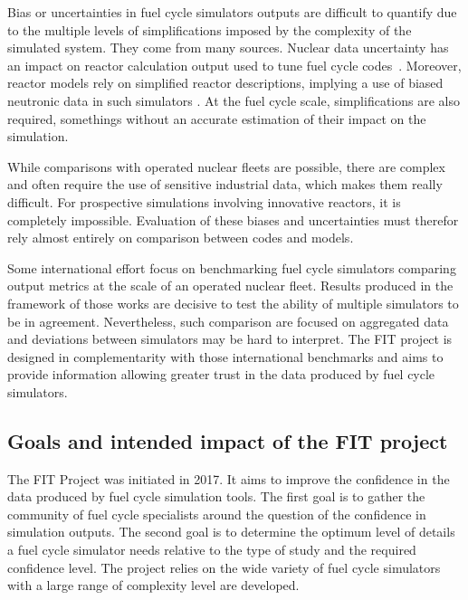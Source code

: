 Bias or uncertainties in fuel cycle simulators outputs are difficult to quantify due to the multiple levels of simplifications imposed by the complexity of the simulated system. They come from many sources.
Nuclear data uncertainty has an impact on reactor calculation output used to tune fuel cycle codes~\cite{Krivtchik_2014}.
Moreover, reactor models rely on simplified reactor descriptions, implying a use of biased neutronic data in such simulators \cite{Somaini_2017}.
At the fuel cycle scale, simplifications are also required, somethings without an accurate estimation of their impact on the simulation.

While comparisons with operated nuclear fleets are possible, there are complex and often require the use of sensitive industrial data, which makes them really difficult. For prospective simulations involving innovative reactors, it is completely impossible.
Evaluation of these biases and uncertainties must therefor rely almost entirely on comparison between codes and models.

Some international effort \cite{NEA2016} focus on benchmarking fuel cycle simulators comparing output metrics at the scale of an operated nuclear fleet.
Results produced in the framework of those works are decisive to test the ability of multiple simulators to be in agreement.
Nevertheless, such comparison are focused on aggregated data and deviations between simulators may be hard to interpret.
The FIT project is designed in complementarity with those international benchmarks and aims to provide information allowing greater trust in the data produced by fuel cycle simulators.


\subsection{Goals and intended impact of the FIT project}

The FIT Project was initiated in 2017. It aims to improve the confidence in the
data produced by fuel cycle simulation tools. The first goal is to gather the
community of fuel cycle specialists around the question of the confidence in
simulation outputs. The second goal is to determine the optimum level of details
a fuel cycle simulator needs relative to the type of study and the required
confidence level. The project relies on the wide variety of fuel cycle
simulators with a large range of complexity level are developed.

